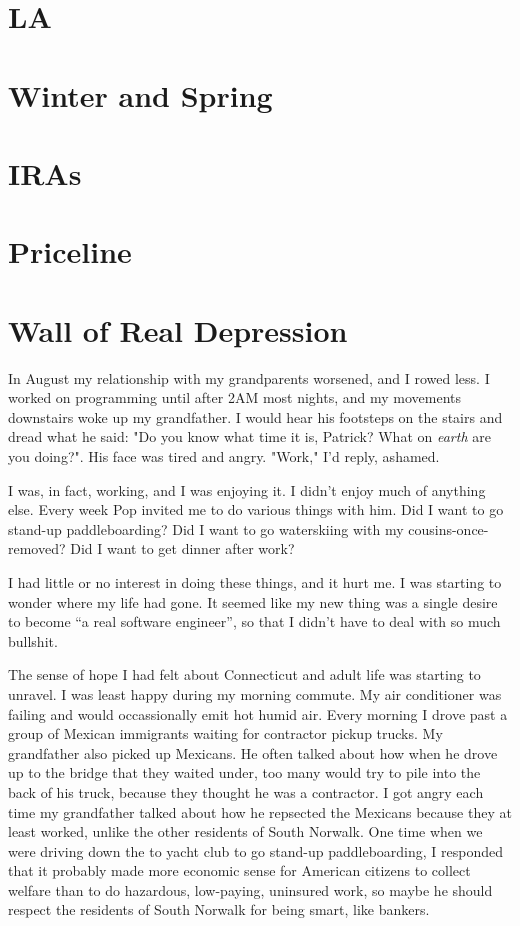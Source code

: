 \documentclass[12pt]{article}
\begin{document}
\section{LA}


\section{Winter and Spring}


\section{IRAs}


\section{Priceline}


\section{Wall of Real Depression}
In August my relationship with my grandparents worsened, and I rowed less.  I
worked on programming until after 2AM most nights, and my movements downstairs
woke up my grandfather.  I would hear his footsteps on the stairs and dread what
he said: "Do you know what time it is, Patrick?  What on \textit{earth} are you
doing?".  His face was tired and angry. "Work," I'd reply, ashamed.

I was, in fact, working, and I was enjoying it.  I didn't enjoy much of anything
else.  Every week Pop invited me to do various things with him.  Did I want to
go stand-up paddleboarding?  Did I want to go waterskiing with my cousins-once-
removed?  Did I want to get dinner after work?  

I had little or no interest in doing these things, and it hurt me.  I was
starting to wonder where my life had gone.  It seemed like my new thing was
a single desire to become ``a real software engineer'', so that I didn't have to
deal with so much bullshit.  

The sense of hope I had felt about Connecticut and adult life was starting to
unravel.  I was least happy during my morning commute.  My air conditioner was
failing and would occassionally emit hot humid air.  Every morning I drove past
a group of Mexican immigrants waiting for contractor pickup trucks.  My
grandfather also picked up Mexicans.  He often talked about how when he drove up
to the bridge that they waited under, too many would try to pile into the back
of his truck, because they thought he was a contractor.  I got angry each time
my grandfather talked about how he repsected the Mexicans because they at least
worked, unlike the other residents of South Norwalk.  One time when we were
driving down the to yacht club to go stand-up paddleboarding, I responded that
it probably made more economic sense for American citizens to collect welfare
than to do hazardous, low-paying, uninsured work, so maybe he should respect the
residents of South Norwalk for being smart, like bankers. 
\end{document}
